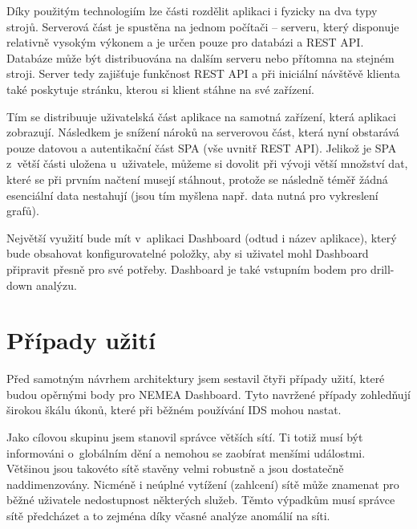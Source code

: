 Díky použitým technologiím lze části rozdělit aplikaci i fyzicky na dva typy strojů. Serverová část je spustěna na jednom počítači -- serveru, který disponuje relativně vysokým výkonem a je určen pouze pro databázi a REST API. Databáze může být distribuována na dalším serveru nebo přítomna na stejném stroji. Server tedy zajišťuje funkčnost REST API a při iniciální návštěvě klienta také poskytuje stránku, kterou si klient stáhne na své zařízení.

Tím se distribuuje uživatelská část aplikace na samotná zařízení, která aplikaci zobrazují. Následkem je snížení nároků na serverovou část, která nyní obstarává pouze datovou a autentikační část SPA (vše uvnitř REST API). Jelikož je SPA z~větší části uložena u~uživatele, můžeme si dovolit při vývoji větší množství dat, které se při prvním načtení musejí stáhnout, protože se následně téměř žádná esenciální data nestahují (jsou tím myšlena např. data nutná pro vykreslení grafů).

Největší využití bude mít v~aplikaci Dashboard (odtud i název aplikace), který bude obsahovat konfigurovatelné položky, aby si uživatel mohl Dashboard připravit přesně pro své potřeby. Dashboard je také vstupním bodem pro drill-down analýzu.

\section{Případy užití}
Před samotným návrhem architektury jsem sestavil čtyři případy užití, které budou opěrnými body pro NEMEA Dashboard. Tyto navržené případy zohledňují širokou škálu úkonů, které při běžném používání IDS mohou nastat.

Jako cílovou skupinu jsem stanovil správce větších sítí. Ti totiž musí být informováni o~globálním dění a nemohou se zaobírat menšími událostmi. Většinou jsou takovéto sítě stavěny velmi robustně a jsou dostatečně naddimenzovány. Nicméně i neúplné vytížení (zahlcení) sítě může znamenat pro běžné uživatele nedostupnost některých služeb. Těmto výpadkům musí správce sítě předcházet a to zejména díky včasné analýze anomálií na síti.

